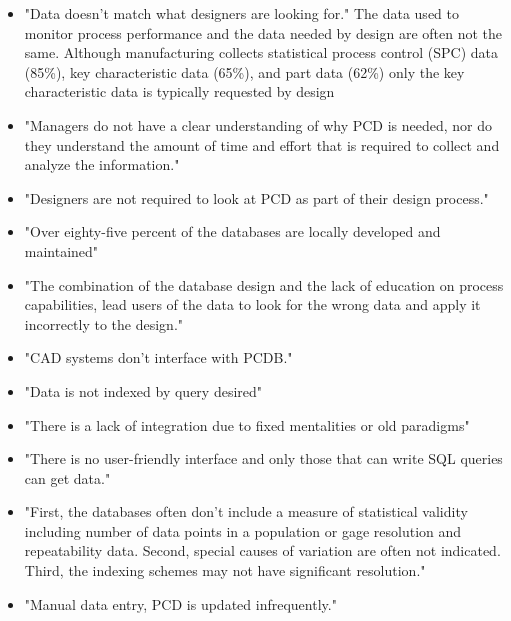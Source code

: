 \documentclass[aip,amsmath,reprint, author-year]{revtex4-1}
\begin{document}
\begin{itemize}

\item{"Data doesn’t match what designers are looking for." The data used to monitor process performance and the data needed by design are often not the same. Although manufacturing collects statistical process control (SPC) data (85\%), key characteristic data (65\%), and part data (62\%) only the key characteristic data is typically requested by design}

\item{"Managers do not have a clear understanding of why PCD is needed, nor do they understand the amount of time and effort that is required to collect and analyze the information."}

\item{"Designers are not required to look at PCD as part of their design process."}

\item{"Over eighty-five percent of the databases are locally developed and maintained"}

\item{"The combination of the database design and the lack of education on process capabilities, lead users of the data to look for the wrong data and apply it incorrectly to the design."}

\item{"CAD systems don’t interface with PCDB."}

\item{"Data is not indexed by query desired"}

\item{"There is a lack of integration due to fixed mentalities or old paradigms"}

\item{"There is no user-friendly interface and only those that can write SQL queries can get data."}

\item{"First, the databases often don’t include a measure of statistical validity including number of data points in a population or gage resolution and repeatability data. Second, special causes of variation are often not indicated. Third, the indexing schemes may not have significant resolution."}

\item{"Manual data entry, PCD is updated infrequently."}


\end{itemize} 
\end{document}
